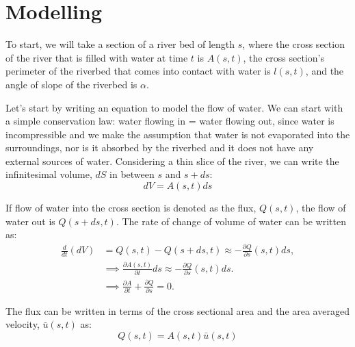 \documentclass[12pt]{article}
\begin{document}
\section{Modelling}
To start, we will take a section of a river bed of length $s$, where the cross section of the river that is filled with water at time $t$ is $A(s, t)$, the cross section's perimeter of the riverbed that comes into contact with water is $l(s, t)$, and the angle of slope of the riverbed is $\alpha$. 

Let's start by writing an equation to model the flow of water. We can start with a simple conservation law: water flowing in = water flowing out, since  water is incompressible and we make the assumption that water is not evaporated into the surroundings, nor is it absorbed by the riverbed and it does not  have any external sources of water. Considering a thin slice of the river, we can write the infinitesimal volume, $dS$ in between $s$ and $s + ds$:
\begin{equation}
    dV = A(s,t)ds
\end{equation}

If flow of water into the cross section is denoted as the flux, $Q(s, t)$, the flow of water out is $Q(s +  ds, t)$. The rate of change of volume of water can be written as:
\begin{align}
    \frac{d}{dt}(dV) &= Q(s,t) - Q(s+ds,t) \approx -\frac{\partial Q}{\partial s}(s,t)ds, \\
    &\implies \frac{\partial A(s,t)}{\partial t}ds \approx -\frac{\partial Q}{\partial s}(s,t)ds.
    \\ &\implies \frac{\partial A}{\partial t} + \frac{\partial Q}{\partial s} =0. \label{PDE general}
\end{align}

The flux can be written in terms of the cross sectional area and the area averaged velocity, $\bar{u}(s, t)$ as:
\begin{equation}
    Q(s,t) = A(s, t) \bar{u}(s, t)
    \label{eqn:qAu}
\end{equation}
\end{document}

